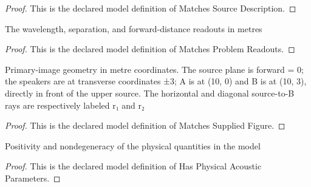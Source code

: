 \begin{proof}
  This is the declared model definition of Matches Source Description.
\end{proof}
\begin{definition}
  \label{def:physics:phyx-mini-0246:phyxminiproblems-problemphyxmini0246-matchesproblemreadouts}
  The wavelength, separation, and forward-distance readouts in metres
\end{definition}
\begin{proof}
  This is the declared model definition of Matches Problem Readouts.
\end{proof}
\begin{definition}
  \label{def:physics:phyx-mini-0246:phyxminiproblems-problemphyxmini0246-matchessuppliedfigure}
  Primary-image geometry in metre coordinates. The source plane is forward = 0; the speakers are at transverse coordinates ±3; A is at (10, 0) and B is at (10, 3), directly in front of the upper source. The horizontal and diagonal source-to-B rays are respectively labeled r₁ and r₂
\end{definition}
\begin{proof}
  This is the declared model definition of Matches Supplied Figure.
\end{proof}
\begin{definition}
  \label{def:physics:phyx-mini-0246:phyxminiproblems-problemphyxmini0246-hasphysicalacousticparameters}
  Positivity and nondegeneracy of the physical quantities in the model
\end{definition}
\begin{proof}
  This is the declared model definition of Has Physical Acoustic Parameters.
\end{proof}
